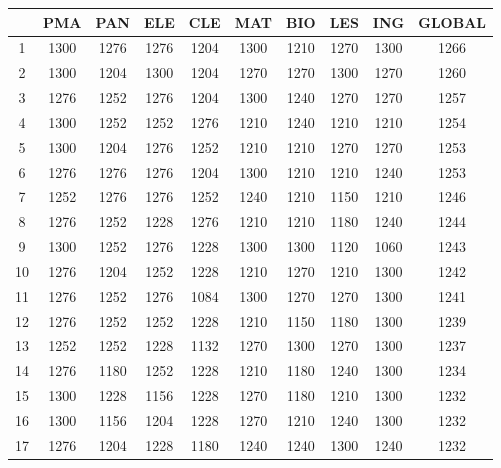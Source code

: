 \documentclass{article}
\begin{document}
\begin{table}[H]
\centering
\begin{tabular}{c|c|c|c|c|c|c|c|c|c|}
\cline{2-10}
 & \textbf{PMA} & \textbf{PAN} & \textbf{ELE} & \textbf{CLE} & \textbf{MAT} & \textbf{BIO} & \textbf{LES} & \textbf{ING} & \textbf{GLOBAL} \\ \hline
\multicolumn{1}{|c|}{1}   & 1300 & 1276 & 1276 & 1204 & 1300 & 1210 & 1270 & 1300 & 1266 \\ \hline
\multicolumn{1}{|c|}{2}   & 1300 & 1204 & 1300 & 1204 & 1270 & 1270 & 1300 & 1270 & 1260 \\ \hline
\multicolumn{1}{|c|}{3}   & 1276 & 1252 & 1276 & 1204 & 1300 & 1240 & 1270 & 1270 & 1257 \\ \hline
\multicolumn{1}{|c|}{4}   & 1300 & 1252 & 1252 & 1276 & 1210 & 1240 & 1210 & 1210 & 1254 \\ \hline
\multicolumn{1}{|c|}{5}   & 1300 & 1204 & 1276 & 1252 & 1210 & 1210 & 1270 & 1270 & 1253 \\ \hline
\multicolumn{1}{|c|}{6}   & 1276 & 1276 & 1276 & 1204 & 1300 & 1210 & 1210 & 1240 & 1253 \\ \hline
\multicolumn{1}{|c|}{7}   & 1252 & 1276 & 1276 & 1252 & 1240 & 1210 & 1150 & 1210 & 1246 \\ \hline
\multicolumn{1}{|c|}{8}   & 1276 & 1252 & 1228 & 1276 & 1210 & 1210 & 1180 & 1240 & 1244 \\ \hline
\multicolumn{1}{|c|}{9}   & 1300 & 1252 & 1276 & 1228 & 1300 & 1300 & 1120 & 1060 & 1243 \\ \hline
\multicolumn{1}{|c|}{10}  & 1276 & 1204 & 1252 & 1228 & 1210 & 1270 & 1210 & 1300 & 1242 \\ \hline
\multicolumn{1}{|c|}{11}  & 1276 & 1252 & 1276 & 1084 & 1300 & 1270 & 1270 & 1300 & 1241 \\ \hline
\multicolumn{1}{|c|}{12}  & 1276 & 1252 & 1252 & 1228 & 1210 & 1150 & 1180 & 1300 & 1239 \\ \hline
\multicolumn{1}{|c|}{13}  & 1252 & 1252 & 1228 & 1132 & 1270 & 1300 & 1270 & 1300 & 1237 \\ \hline
\multicolumn{1}{|c|}{14}  & 1276 & 1180 & 1252 & 1228 & 1210 & 1180 & 1240 & 1300 & 1234 \\ \hline
\multicolumn{1}{|c|}{15}  & 1300 & 1228 & 1156 & 1228 & 1270 & 1180 & 1210 & 1300 & 1232 \\ \hline
\multicolumn{1}{|c|}{16}  & 1300 & 1156 & 1204 & 1228 & 1270 & 1210 & 1240 & 1300 & 1232 \\ \hline
\multicolumn{1}{|c|}{17}  & 1276 & 1204 & 1228 & 1180 & 1240 & 1240 & 1300 & 1240 & 1232 \\ \hline

\end{tabular}
\end{table}
\end{document}
